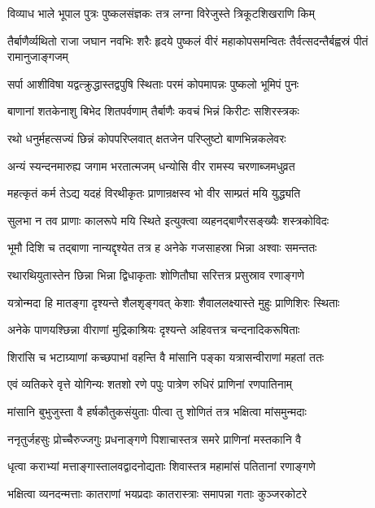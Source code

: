 \twolineshloka
{विव्याध भाले भूपाल पुत्रः पुष्कलसंज्ञकः}
{तत्र लग्ना विरेजुस्ते त्रिकूटशिखराणि किम्}%


\threelineshloka
{तैर्बाणैर्व्यथितो राजा जघान नवभिः शरैः}
{हृदये पुष्कलं वीरं महाकोपसमन्वितः}
{तैर्वत्सदन्तैर्बह्वस्रं पीतं रामानुजाङ्गजम्}%

\twolineshloka
{सर्पा आशीविषा यद्वत्क्रुद्धास्तद्वपुषि स्थिताः}
{परमं कोपमापन्नः पुष्कलो भूमिपं पुनः}%

\twolineshloka
{बाणानां शतकेनाशु बिभेद शितपर्वणाम्}
{तैर्बाणैः कवचं भिन्नं किरीटः सशिरस्त्रकः}%

\twolineshloka
{रथो धनुर्महत्सज्यं छिन्नं कोपपरिप्लवात्}
{क्षतजेन परिप्लुष्टो बाणभिन्नकलेवरः}%

\twolineshloka
{अन्यं स्यन्दनमारुह्य जगाम भरतात्मजम्}
{धन्योसि वीर रामस्य चरणाब्जमधुव्रत}%

\twolineshloka
{महत्कृतं कर्म तेऽद्य यदहं विरथीकृतः}
{प्राणान्रक्षस्व भो वीर साम्प्रतं मयि युद्ध्यति}%

\twolineshloka
{सुलभा न तव प्राणाः कालरूपे मयि स्थिते}
{इत्युक्त्वा व्यहनद्बाणैरसङ्ख्यैः शस्त्रकोविदः}%

\twolineshloka
{भूमौ दिशि च तद्बाणा नान्यद्दृश्येत तत्र ह}
{अनेके गजसाहस्रा भिन्ना अश्वाः समन्ततः}%

\twolineshloka
{रथारथियुतास्तेन छिन्ना भिन्ना द्विधाकृताः}
{शोणितौघा सरित्तत्र प्रसुस्राव रणाङ्गणे}%

\twolineshloka
{यत्रोन्मदा हि मातङ्गा दृश्यन्ते शैलशृङ्गवत्}
{केशाः शैवाललक्ष्यास्ते मुहुः प्राणिशिरः स्थिताः}%

\twolineshloka
{अनेके पाणयश्छिन्ना वीराणां मुद्रिकाश्रियः}
{दृश्यन्ते अहिवत्तत्र चन्दनादिकरूषिताः}%

\twolineshloka
{शिरांसि च भटाग्र्याणां कच्छपाभां वहन्ति वै}
{मांसानि पङ्का यत्रासन्वीराणां महतां ततः}%

\twolineshloka
{एवं व्यतिकरे वृत्ते योगिन्यः शतशो रणे}
{पपुः पात्रेण रुधिरं प्राणिनां रणपातिनाम्}%

\twolineshloka
{मांसानि बुभुजुस्ता वै हर्षकौतुकसंयुताः}
{पीत्वा तु शोणितं तत्र भक्षित्वा मांसमुन्मदाः}%

\twolineshloka
{ननृतुर्जहसुः प्रोच्चैरुज्जगुः प्रधनाङ्गणे}
{पिशाचास्तत्र समरे प्राणिनां मस्तकानि वै}%

\twolineshloka
{धृत्वा कराभ्यां मत्ताङ्गास्तालवद्वादनोद्यताः}
{शिवास्तत्र महामांसं पतितानां रणाङ्गणे}%

\twolineshloka
{भक्षित्वा व्यनदन्मत्ताः कातराणां भयप्रदाः}
{कातरास्त्राः समापन्ना गताः कुञ्जरकोटरे}%

